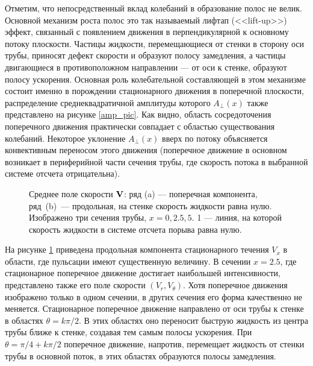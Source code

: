 Отметим, что непосредственный вклад колебаний в образование полос не велик. Основной механизм роста полос это так называемый лифтап (<<lift-up>>) эффект, связанный с появлением движения в перпендикулярной к основному потоку плоскости. Частицы жидкости, перемещающиеся от стенки в сторону оси трубы, приносят дефект скорости и образуют полосу замедления, а частицы двигающиеся в противоположном направлении --- от оси к стенке, образуют полосу ускорения. Основная роль колебательной составляющей в этом механизме состоит именно в порождении стационарного движения в поперечной плоскости, распределение среднеквадратичной амплитуды которого $A_{\perp}(x)$ также представлено на рисунке \ref{amp_pic}. Как видно, область сосредоточения поперечного движения практически совпадает с областью существования колебаний. Некоторое уклонение $A_{\perp}(x)$ вверх по потоку объясняется конвективным переносом этого движения (поперечное движение в основном возникает в периферийной части сечения трубы, где скорость потока в выбранной системе отсчета отрицательна).

\begin{figure}[h]
\caption{Среднее поле скорости $\mathbf{V}$: ряд (a) --- поперечная компонента, ряд~(b)~--- продольная, на стенке скорость жидкости равна нулю. Изображено три сечения трубы, $x = 0, 2.5, 5$. 1 --- линия, на которой скорость жидкости в системе отсчета порыва равна нулю.}
\label{VEL_cs_pic}
\end{figure}

На рисунке \ref{VEL_cs_pic} приведена продольная компонента стационарного течения $V_x$ в области, где пульсации имеют существенную величину. В сечении $x = 2.5$, где стационарное поперечное движение достигает наибольшей интенсивности, представлено также его поле скорости $(V_r, V_\theta)$. Хотя поперечное движения изображено только в одном сечении, в других сечения его форма качественно не меняется. Стационарное поперечное движение направлено от оси трубы к стенке в областях $\theta=k\pi/2$. В этих областях оно переносит быструю жидкость из центра трубы ближе к стенке, создавая тем самым полосы ускорения. При $\theta=\pi/4+k\pi/2$ поперечное движение, напротив, перемещает жидкость от стенки трубы в основной поток, в этих областях образуются полосы замедления. 

